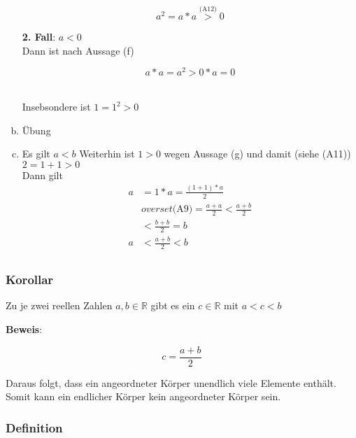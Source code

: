 \documentclass{article}
\begin{document}
\begin{enumerate}[(a)]
\begin{minipage}[t]{.4\textwidth}
    \[
      a^2 = a * a \overset{\text{(A12)}}> 0
    \]
  \end{minipage}
  \hfill
  \vrule
  \hfill
  \begin{minipage}[t]{.4\textwidth}
    \textbf{2. Fall}: $a < 0$ \\

    Dann ist nach Aussage (f)

    \[
      a * a = a^2 > 0 * a = 0
    \]
  \end{minipage}  \\
  Insebsondere ist $1 = 1^2 > 0$
\item Übung
\item Es gilt $a < b$ Weiterhin ist $1 > 0$ wegen Aussage (g) und damit (siehe (A11)) $2 = 1 + 1 > 0$ \\

  Dann gilt
  \begin{align*}
    a &= 1 * a = \frac{(1 + 1) * a}{2} \\
      &overset{\text{(A9)}}= \frac{a + a}{2} < \frac{a+b}{2} \\
      &< \frac{b+b}{2}  = b \\
    a &< \frac{a + b}{2} < b \\ 
  \end{align*}
\end{enumerate}

\subsubsection{Korollar}


Zu je zwei reellen Zahlen $a,b \in \mathbb{R}$ gibt es ein $c \in \mathbb{R}$ mit $a < c < b$

\textbf{Beweis}:

\[
  c = \frac{a + b}{2}
\]

Daraus folgt, dass ein angeordneter Körper unendlich viele Elemente enthält.
Somit kann ein endlicher Körper kein angeordneter Körper sein.

\subsubsection{Definition}
\end{document}
